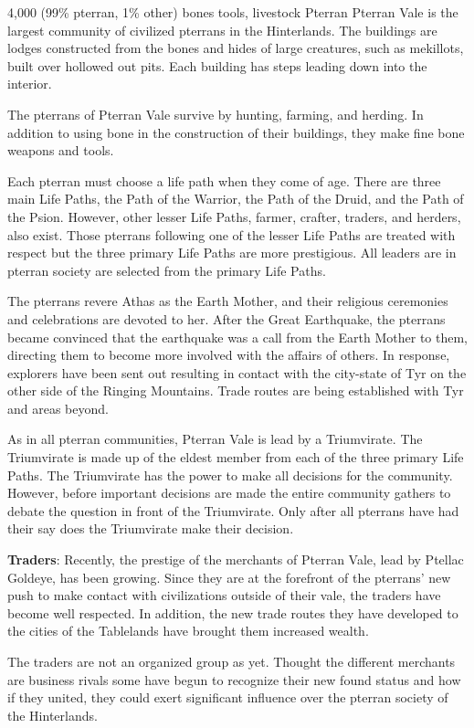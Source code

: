 {4,000 (99\% pterran, 1\% other)}
{bones tools, livestock}
{Pterran}
{
	Pterran Vale is the largest community of civilized pterrans in the Hinterlands. The buildings are lodges constructed from the bones and hides of large creatures, such as mekillots, built over hollowed out pits. Each building has steps leading down into the interior.
}
{
	The pterrans of Pterran Vale survive by hunting, farming, and herding. In addition to using bone in the construction of their buildings, they make fine bone weapons and tools.

	Each pterran must choose a life path when they come of age. There are three main Life Paths, the Path of the Warrior, the Path of the Druid, and the Path of the Psion. However, other lesser Life Paths, farmer, crafter, traders, and herders, also exist. Those pterrans following one of the lesser Life Paths are treated with respect but the three primary Life Paths are more prestigious. All leaders are in pterran society are selected from the primary Life Paths.

	The pterrans revere Athas as the Earth Mother, and their religious ceremonies and celebrations are devoted to her. After the Great Earthquake, the pterrans became convinced that the earthquake was a call from the Earth Mother to them, directing them to become more involved with the affairs of others. In response, explorers have been sent out resulting in contact with the city-state of Tyr on the other side of the Ringing Mountains. Trade routes are being established with Tyr and areas beyond.
}
{
	As in all pterran communities, Pterran Vale is lead by a Triumvirate. The Triumvirate is made up of the eldest member from each of the three primary Life Paths. The Triumvirate has the power to make all decisions for the community. However, before important decisions are made the entire community gathers to debate the question in front of the Triumvirate. Only after all pterrans have had their say does the Triumvirate make their decision.
}
{
	\textbf{Traders}: Recently, the prestige of the merchants of Pterran Vale, lead by Ptellac Goldeye, has been growing. Since they are at the forefront of the pterrans' new push to make contact with civilizations outside of their vale, the traders have become well respected. In addition, the new trade routes they have developed to the cities of the Tablelands have brought them increased wealth.

	The traders are not an organized group as yet. Thought the different merchants are business rivals some have begun to recognize their new found status and how if they united, they could exert significant influence over the pterran society of the Hinterlands.
}
